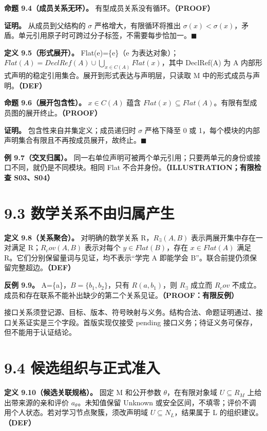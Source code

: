 \documentclass[UTF8,a4paper,zihao=-4,fontset=windows,openany]{ctexbook}
\def\mathrm#1{#1}%
\begin{document}
\textbf{命题 9.4（成员关系无环）。} 有型成员关系没有循环。\textbf{（PROOF）}

\textbf{证明。} 从成员到父结构的 \(\sigma\) 严格增大，有限循环将推出 \(\sigma(x)<\sigma(x)\)，矛盾。单元引用原子时可跨过分子标签，不需要每步恰加一。\(\blacksquare\)

\textbf{定义 9.5（形式展开）。} Flat(e)=\{e\}（e 为表达对象）；\(\mathrm{Flat}(A)=\mathrm{DeclRef}(A)\cup\bigcup_{x\in C(A)}\mathrm{Flat}(x)\)，其中 DeclRef(A) 为 A 内部形式声明的稳定引用集合。展开到形式表达与声明层，只读取 M 中的形式成员与声明。\textbf{（DEF）}

\textbf{命题 9.6（展开包含性）。} \(x\in C(A)\) 蕴含 \(\mathrm{Flat}(x)\subseteq\mathrm{Flat}(A)\)。有限有型成员图的展开终止。\textbf{（PROOF）}

\textbf{证明。} 包含性来自并集定义；成员递归时 \(\sigma\) 严格下降至 0 或 1，每个模块的内部声明集合有限且不再按成员展开，故终止。\(\blacksquare\)

\textbf{例 9.7（交叉归属）。} 同一右单位声明可被两个单元引用；只要两单元的身份或接口不同，就仍是不同模块。相同 Flat 不合并身份。\textbf{（ILLUSTRATION；有限检查 S03、S04）}

\section{9.3 数学关系不由归属产生}
\textbf{定义 9.8（关系聚合）。} 对明确的数学关系 R，\(R_\exists(A,B)\) 表示两展开集中存在一对满足 R；\(R_\mathrm{cov}(A,B)\) 表示对每个 \(y\in\mathrm{Flat}(B)\)，存在 \(x\in\mathrm{Flat}(A)\) 满足 R。它们分别保留量词与见证，均不表示“学完 A 即能学会 B”。联合前提仍须保留完整超边。\textbf{（DEF）}

\textbf{反例 9.9。} A=\{a\}，\(B=\{b_{1},b_{2}\}\)，只有 \(R(a,b_{1})\)，则 \(R_\exists\) 成立而 \(R_\mathrm{cov}\) 不成立。成员和存在联系不能补出缺少的第二个关系见证。\textbf{（PROOF：有限反例）}

接口关系须登记源、目标、版本、符号映射与义务。结构合法、命题证明通过、接口关系证实是三个字段。首版实现仅接受 pending 接口义务；待证义务可保存，但不能用于认证结论。

\section{9.4 候选组织与正式准入}
\textbf{定义 9.10（候选关联规格）。} 固定 M 和公开参数 \(\theta\)，在有限对象域 \(U\subseteq R_M\) 上给出带来源的亲和评价 \(a_\theta\)。未知值保留 Unknown 或安全区间，不填零；评价不调用个人状态。若对学习节点聚簇，须改声明域 \(U\subseteq N_L\)，结果属于 L 的组织建议。\textbf{（DEF）}
\end{document}
